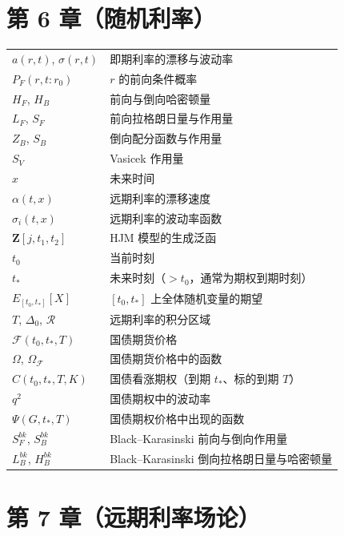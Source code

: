 \section*{第 6 章（随机利率）}

\begin{center}
\begin{tabular}{@{}L{3.2cm}L{10.6cm}@{}}
\toprule
$a(r,t)$, $\sigma(r,t)$ & 即期利率的漂移与波动率 \\
$P_F(r,t:r_0)$ & $r$ 的前向条件概率 \\
$H_F$, $H_B$ & 前向与倒向哈密顿量 \\
$L_F$, $S_F$ & 前向拉格朗日量与作用量 \\
$Z_B$, $S_B$ & 倒向配分函数与作用量 \\
$S_V$ & Vasicek 作用量 \\
$x$ & 未来时间 \\
$\alpha(t,x)$ & 远期利率的漂移速度 \\
$\sigma_i(t,x)$ & 远期利率的波动率函数 \\
$\mathbf{Z}[j,t_1,t_2]$ & HJM 模型的生成泛函 \\
$t_0$ & 当前时刻 \\
$t_*$ & 未来时刻（$>t_0$，通常为期权到期时刻） \\
$E_{[t_0,t_*]}[X]$ & $[t_0,t_*]$ 上全体随机变量的期望 \\
$T$, $\Delta_0$, $\mathcal{R}$ & 远期利率的积分区域 \\
$\mathcal{F}(t_0,t_*,T)$ & 国债期货价格 \\
$\Omega$, $\Omega_{\mathcal{F}}$ & 国债期货价格中的函数 \\
$C(t_0,t_*,T,K)$ & 国债看涨期权（到期 $t_*$、标的到期 $T$） \\
$q^2$ & 国债期权中的波动率 \\
$\Psi(G,t_*,T)$ & 国债期权价格中出现的函数 \\
$S_F^{bk}$, $S_B^{bk}$ & Black--Karasinski 前向与倒向作用量 \\
$L_B^{bk}$, $H_B^{bk}$ & Black--Karasinski 倒向拉格朗日量与哈密顿量 \\
\bottomrule
\end{tabular}
\end{center}

\section*{第 7 章（远期利率场论）}

